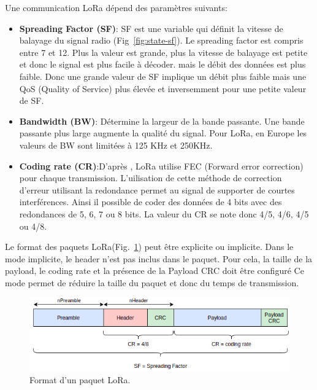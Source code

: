 Une communication LoRa dépend des paramètres suivants:
\begin{itemize}
    \item \textbf{Spreading Factor (SF)}: SF est une variable qui définit la vitesse de balayage du signal radio (Fig~\ref{fig:state-sf}). Le spreading factor est compris entre 7 et 12. Plus la valeur est grande, plus la vitesse de balayage est petite et donc le signal est plus facile à décoder. mais le débit des données est plus faible. Donc une grande valeur de SF implique un débit plus faible mais une QoS (Quality of Service) plus élevée et inversemment pour une petite valeur de SF.
    \item \textbf{Bandwidth (BW)}: Détermine la largeur de la bande passante. Une bande passante plus large augmente la qualité du signal. Pour LoRa, en Europe les valeurs de BW sont limitées à 125 KHz et 250KHz.
    \item \textbf{Coding rate (CR)}:D'après , LoRa utilise FEC (Forward error correction) pour chaque transmission. L'uilisation de cette méthode de correction d'erreur utilisant la redondance permet au signal de supporter de courtes interférences. Ainsi il possible de coder des données de 4 bits avec des redondances de 5, 6, 7 ou 8 bits. La valeur du CR se note donc 
    4/5, 4/6, 4/5 ou 4/8.
\end{itemize}

\vspace{1cm}
Le format des paquets LoRa(Fig.~\ref{fig:state-lora-frame-format}) peut être explicite ou implicite.
Dans le mode implicite, le header n'est pas inclus dans le paquet. Pour cela, la taille de la payload, le coding rate et la présence de la Payload CRC doit être configuré 
Ce mode permet de réduire la taille du paquet et donc du temps de transmission.

\begin{figure}[H]
    \centering
    \includegraphics[scale=0.6]{res/pictures/lora-frame-format.drawio.png}
    \caption{Format d'un paquet LoRa.}
    \label{fig:state-lora-frame-format}
\end{figure}
